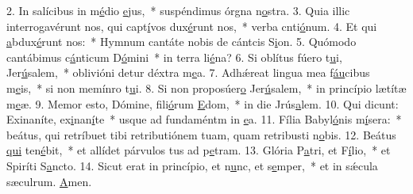 2. In salícibus in m\uline{é}dio \uline{e}jus,~* suspéndimus órgna n\uline{o}stra.
3. Quia illic interrogavérunt nos, qui capt\uline{í}vos dux\uline{é}runt nos,~* verba cnti\uline{ó}num.
4. Et qui \uline{a}bdux\uline{é}runt nos:~* Hymnum cantáte nobis de cántcis S\uline{i}on.
5. Quómodo cantábimus c\uline{á}nticum D\uline{ó}mini~* in terra li\uline{é}na?
6. Si oblítus fúero t\uline{u}i, Jer\uline{ú}salem,~* oblivióni detur déxtra m\uline{e}a.
7. Adhǽreat lingua mea f\uline{áu}cibus m\uline{e}is,~* si non memínro t\uline{u}i.
8. Si non proposúer\uline{o} Jer\uline{ú}salem,~* in princípio lætítæ m\uline{e}æ.
9. Memor esto, Dómine, fili\uline{ó}rum \uline{E}dom,~* in die Jrús\uline{a}lem.
10. Qui dicunt: Exinaníte, ex\uline{i}nan\uline{í}te~* usque ad fundaméntm in \uline{e}a.
11. Fília Babyl\uline{ó}nis m\uline{í}sera:~* beátus, qui retríbuet tibi retributiónem tuam, quam retribusti n\uline{o}bis.
12. Beátus \uline{qui} ten\uline{é}bit,~* et allídet párvulos tus ad p\uline{e}tram.
13. Glória P\uline{a}tri, et F\uline{í}lio,~* et Spiríti S\uline{a}ncto.
14. Sicut erat in princípio, et n\uline{u}nc, et s\uline{e}mper,~* et in sǽcula sæculrum. \uline{A}men.
